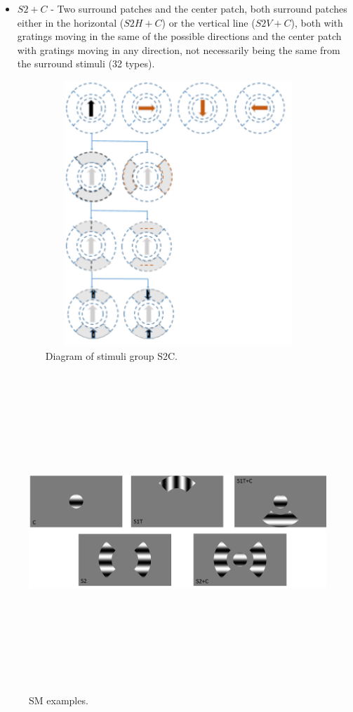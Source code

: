 \begin{itemize}
\item $S2+C$ - Two surround patches and the center patch, both surround patches either in the horizontal ($S2H+C$) or the vertical line ($S2V+C$), both with gratings moving in the same of the possible directions and the center patch with gratings moving in any direction, not necessarily being the same from the surround stimuli (32 types).

\begin{figure}[H] \centering \includegraphics[width=10cm,height=10cm,keepaspectratio]{Figures/4.Chapter/S2C.PNG} \caption{Diagram of stimuli group S2C.} \end{figure}

\end{itemize}


\begin{figure}[H] \centering \includegraphics[width=12cm,height=12cm,keepaspectratio]{Figures/4.Chapter/SM.png} \caption{SM examples.} \end{figure}

